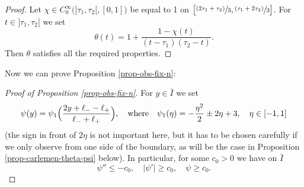 \documentclass[JEP,XML,SOM,Unicode]{cedram}
\newcommand{\psfrac}[2]{\sfrac{(#1)}{#2}}
\theoremstyle{plain}
\theoremstyle{definition}
\newcommand{\abs}[1]{\vert #1\vert}
\newcommand{\1}{\mathds 1}
\begin{document}
\begin{proof}
Let $\chi \in C_0^\infty \bigl(]\tau_1,\tau_2[,[0,1] \bigr)$ be equal to 1 on $\big[\psfrac{2\tau_1 + \tau_2}{3},\psfrac{\tau_1 + 2\tau_2}{3} \big]$. For $t \in{}]\tau_1,\tau_2[$ we set
\[
\theta (t) = 1 + \frac{1 - \chi(t)}{(t-\tau_1)(\tau_2-t)}.
\]
Then $\theta$ satisfies all the required properties.
\end{proof}

Now we can prove Proposition \ref{prop-obs-fix-n}:

\begin{proof}[Proof of Proposition \ref{prop-obs-fix-n}]
For $y \in \bar I$ we set
\[
\psi(y) = \psi_1 \Bigl(\frac {2y + \ell_- - \ell_+}{\ell_- + \ell_+} \Bigr), \quad \text{where} \quad \psi_1(\eta) = - \frac {\eta^2} 2 \pm 2 \eta + 3, \quad \eta\in[-1,1]
\]
(the sign in front of $2\eta$ is not important here, but it has to be chosen carefully if we only observe from one side of the boundary, as will be the case in Proposition \ref{prop-carlemen-theta-psi} below).
In particular, for some $c_0 > 0$ we have on $\bar I$
\begin{equation} \label{eq-prop-psi}
\psi'' \leq - c_0, \quad \abs{\psi'} \geq c_0, \quad \psi \geq c_0.
\end{equation}


\end{proof}
\end{document}
